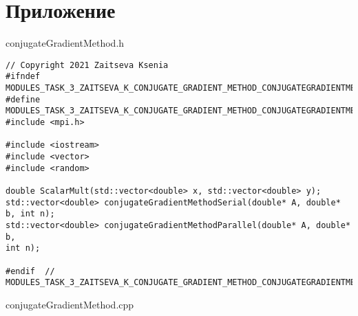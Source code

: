 \documentclass{report}
\begin{document}
\section*{Приложение}

conjugateGradientMethod.h
\begin{lstlisting}
// Copyright 2021 Zaitseva Ksenia
#ifndef MODULES_TASK_3_ZAITSEVA_K_CONJUGATE_GRADIENT_METHOD_CONJUGATEGRADIENTMETHOD_H_
#define MODULES_TASK_3_ZAITSEVA_K_CONJUGATE_GRADIENT_METHOD_CONJUGATEGRADIENTMETHOD_H_
#include <mpi.h>

#include <iostream>
#include <vector>
#include <random>

double ScalarMult(std::vector<double> x, std::vector<double> y);
std::vector<double> conjugateGradientMethodSerial(double* A, double* b, int n);
std::vector<double> conjugateGradientMethodParallel(double* A, double* b,
int n);

#endif  // MODULES_TASK_3_ZAITSEVA_K_CONJUGATE_GRADIENT_METHOD_CONJUGATEGRADIENTMETHOD_H_

\end{lstlisting}
conjugateGradientMethod.cpp
\end{document}
